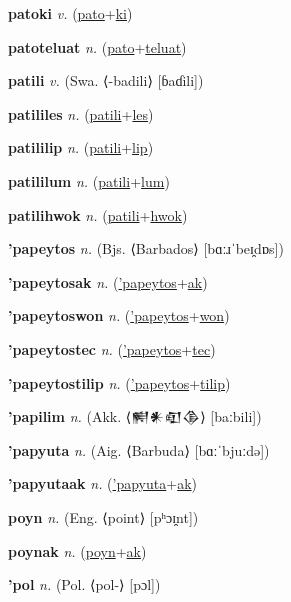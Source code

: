 \textbf{\hypertarget{patoki}{patoki}} \textit{v.} (\hyperlink{pato}{pato}+\allowbreak \hyperlink{ki}{ki})


\textbf{\hypertarget{patoteluat}{patoteluat}} \textit{n.} (\hyperlink{pato}{pato}+\allowbreak \hyperlink{teluat}{teluat})


\textbf{\hypertarget{patili}{patili}} \textit{v.} (Swa. ⟨-badili⟩ [ɓaɗili])


\textbf{\hypertarget{patililes}{patililes}} \textit{n.} (\hyperlink{patili}{patili}+\allowbreak \hyperlink{les}{les})


\textbf{\hypertarget{patililip}{patililip}} \textit{n.} (\hyperlink{patili}{patili}+\allowbreak \hyperlink{lip}{lip})


\textbf{\hypertarget{patililum}{patililum}} \textit{n.} (\hyperlink{patili}{patili}+\allowbreak \hyperlink{lum}{lum})


\textbf{\hypertarget{patilihwok}{patilihwok}} \textit{n.} (\hyperlink{patili}{patili}+\allowbreak \hyperlink{hwok}{hwok})


\textbf{\hypertarget{'papeytos}{'papeytos}} \textit{n.} (Bjs. ⟨Barbados⟩ [bɑːɹˈbeɪ̯dɒs])


\textbf{\hypertarget{'papeytosak}{'papeytosak}} \textit{n.} (\hyperlink{'papeytos}{'papeytos}+\allowbreak \hyperlink{ak}{ak})


\textbf{\hypertarget{'papeytoswon}{'papeytoswon}} \textit{n.} (\hyperlink{'papeytos}{'papeytos}+\allowbreak \hyperlink{won}{won})


\textbf{\hypertarget{'papeytostec}{'papeytostec}} \textit{n.} (\hyperlink{'papeytos}{'papeytos}+\allowbreak \hyperlink{tec}{tec})


\textbf{\hypertarget{'papeytostilip}{'papeytostilip}} \textit{n.} (\hyperlink{'papeytos}{'papeytos}+\allowbreak \hyperlink{tilip}{tilip})


\textbf{\hypertarget{'papilim}{'papilim}} \textit{n.} (Akk. ⟨{\cuneiform{}𒆍𒀭𒊏𒆠}⟩ [baːbili])


\textbf{\hypertarget{'papyuta}{'papyuta}} \textit{n.} (Aig. ⟨Barbuda⟩ [bɑːˈbjuːdə])


\textbf{\hypertarget{'papyutaak}{'papyutaak}} \textit{n.} (\hyperlink{'papyuta}{'papyuta}+\allowbreak \hyperlink{ak}{ak})


\textbf{\hypertarget{poyn}{poyn}} \textit{n.} (Eng. ⟨point⟩ [pʰɔɪ̯nt])


\textbf{\hypertarget{poynak}{poynak}} \textit{n.} (\hyperlink{poyn}{poyn}+\allowbreak \hyperlink{ak}{ak})


\textbf{\hypertarget{'pol}{'pol}} \textit{n.} (Pol. ⟨pol-⟩ [pɔl])


